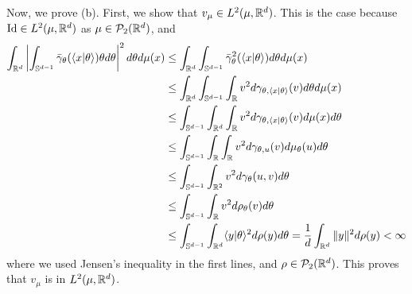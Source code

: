 Now, we prove (b). First, we show that $v_\mu \in L^2(\mu,\mathbb R^d)$. This is the case because $\mathop{\mathrm{Id}}\nolimits \in L^2(\mu,\mathbb R^d)$ as $\mu \in \mathcal{P}_2(\mathbb R^d)$, and
\begin{align}
    \int_{\mathbb R^d}\left|\int_{\mathbb S^{d-1}}\bar{\gamma}_\theta(\langle x|\theta\rangle)\theta d\theta\right|^2 d\theta d\mu(x) &\leq \int_{\mathbb R^d} \int_{\mathbb S^{d-1}} \bar{\gamma}^2_\theta(\langle x|\theta\rangle) d\theta d\mu(x) \\
    &\leq \int_{\mathbb R^d} \int_{\mathbb S^{d-1}} \int_\mathbb R v^2 d\gamma_{\theta,\langle x|\theta\rangle}(v) d\theta d\mu(x) \\
    &\leq \int_{\mathbb S^{d-1}} \int_{\mathbb R^d} \int_\mathbb R v^2 d\gamma_{\theta,\langle x|\theta\rangle}(v) d\mu(x) d\theta \\
    &\leq \int_{\mathbb S^{d-1}} \int_{\mathbb R} \int_\mathbb R v^2 d\gamma_{\theta,u}(v) d\mu_\theta(u) d\theta \\
    &\leq \int_{\mathbb S^{d-1}} \int_{\mathbb R^2} v^2 d\gamma_{\theta}(u,v) d\theta \\
    &\leq \int_{\mathbb S^{d-1}} \int_\mathbb R v^2 d\rho_\theta(v) d\theta \\
    &\leq \int_{\mathbb S^{d-1}} \int_{\mathbb R^d} \langle y|\theta\rangle^2 d\rho(y) d\theta = \frac{1}{d} \int_{\mathbb R^d} \|y\|^2 d\rho(y) < \infty
\end{align}
where we used Jensen's inequality in the first lines, and $\rho \in \mathcal{P}_2(\mathbb R^d)$. This proves that $v_\mu$ is in $L^2(\mu,\mathbb R^d)$. \newline

